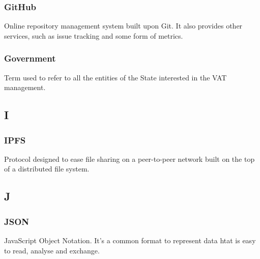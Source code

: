 \subsubsection*{GitHub}
Online repository management system built upon Git. It also provides other services, such as issue tracking and some form of metrics.


\subsubsection*{Government}
Term used to refer to all the entities of the State interested in the VAT management.



\subsection*{I}

\subsubsection*{IPFS}
Protocol designed to ease file sharing on a peer-to-peer network built on the top of a distributed file system.
\subsection*{J}

\subsubsection*{JSON}
JavaScript Object Notation. It's a common format to represent data htat is easy to read, analyse and exchange.



